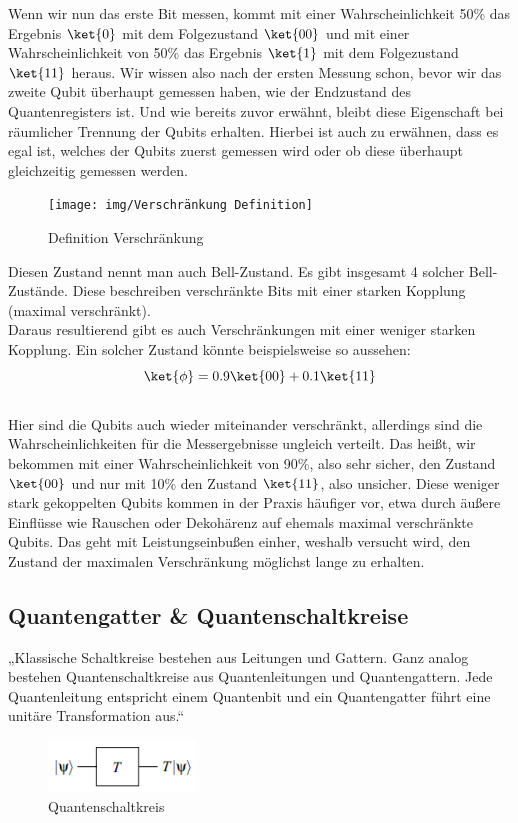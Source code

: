 Wenn wir nun das erste Bit messen, kommt mit einer Wahrscheinlichkeit 50\% das Ergebnis $\ket{0}$ mit dem Folgezustand $\ket{00}$ und mit einer Wahrscheinlichkeit von 50\% das Ergebnis $\ket{1}$ mit dem Folgezustand $\ket{11}$ heraus.
Wir wissen also nach der ersten Messung schon, bevor wir das zweite Qubit überhaupt gemessen haben, wie der Endzustand des Quantenregisters ist.
Und wie bereits zuvor erwähnt, bleibt diese Eigenschaft bei räumlicher Trennung der Qubits erhalten.
Hierbei ist auch zu erwähnen, dass es egal ist, welches der Qubits zuerst gemessen wird oder ob diese überhaupt gleichzeitig gemessen werden.\\
\begin{figure}[H]
    \centering
    \texttt{[image: img/Verschränkung Definition]}
    \caption{Definition Verschränkung}
    \label{fig:verschraenkung}
\end{figure}

Diesen Zustand nennt man auch Bell-Zustand.
Es gibt insgesamt 4 solcher Bell-Zustände.
Diese beschreiben verschränkte Bits mit einer starken Kopplung (maximal verschränkt).\\
Daraus resultierend gibt es auch Verschränkungen mit einer weniger starken Kopplung.
Ein solcher Zustand könnte beispielsweise so aussehen:\\
\begin{equation}
    \ket{\phi} = 0.9\ket{00} + 0.1\ket{11}
\end{equation}\\

Hier sind die Qubits auch wieder miteinander verschränkt, allerdings sind die Wahrscheinlichkeiten für die Messergebnisse ungleich verteilt.
Das heißt, wir bekommen mit einer Wahrscheinlichkeit von 90\%, also sehr sicher, den Zustand $\ket{00}$ und nur mit 10\% den Zustand $\ket{11}$, also unsicher.
Diese weniger stark gekoppelten Qubits kommen in der Praxis häufiger vor, etwa durch äußere Einflüsse wie Rauschen oder Dekohärenz auf ehemals maximal verschränkte Qubits.
Das geht mit Leistungseinbußen einher, weshalb versucht wird, den Zustand der maximalen Verschränkung möglichst lange zu erhalten.\\


\subsection{Quantengatter \& Quantenschaltkreise}
\label{subsec:quantengatter-quantenschaltkreise}

„Klassische Schaltkreise bestehen aus Leitungen und Gattern.
Ganz analog bestehen Quantenschaltkreise aus Quantenleitungen und Quantengattern.
Jede Quantenleitung entspricht einem Quantenbit und ein Quantengatter führt eine unitäre Transformation aus.“\\
\begin{figure}[H]
    \centering
    \includegraphics[width=0.35\textwidth]{img/Quantengatter Basic}
    \caption{Quantenschaltkreis}
    \label{fig:quantenschaltkreis}
\end{figure}

